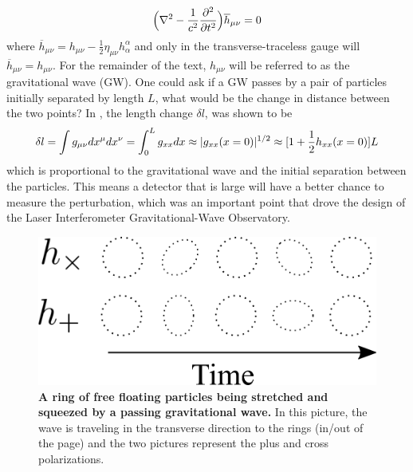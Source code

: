 	\begin{equation} \label{wave}
	\Big(\nabla^2 - \frac{1}{c^2} \pdv[2]{t} \Big) \overline{h}_{\mu \nu}  = 0
	\end{equation}
	where $\overline{h}_{\mu \nu} = h_{\mu \nu} - \frac{1}{2} \eta_{\mu \nu} h^\alpha_\alpha$ and only in the transverse-traceless gauge \cite{SchutzGR} will $\overline{h}_{\mu \nu} = h_{\mu \nu}$.  For the remainder of the text, $h_{\mu \nu}$ will be referred to as the gravitational wave (GW).  One could ask if a GW passes by a pair of particles initially separated by length $L$, what would be the change in distance between the two points? In \cite{SchutzGR}, the length change $\delta l$, was shown to be
	\begin{equation}\label{propdist}
	\delta l
	= \int{g_{\mu \nu} dx^{\mu} dx^{\nu}} \\
	= \int_{0}^{L}{g_{xx} {d}x}\\
	\approx |g_{xx}(x=0)|^{1/2}\\
	\approx [ 1 + \frac{1}{2} h_{xx}(x=0)] L
	\end{equation} 
	which is proportional to the gravitational wave and the initial separation between the particles. This means a detector that is large will have a better chance to measure the perturbation, which was an important point that drove the design of the Laser Interferometer Gravitational-Wave Observatory.
	\begin{figure}[ht]
		\centering
		\includegraphics[width=.4 \textwidth]{../Figures/GW_Particles.png}
		\caption[A ring of free floating particles being stretched and squeezed by a passing gravitational wave.]  
		{\textbf{A ring of free floating particles being stretched and squeezed by a passing gravitational wave.} 
		In this picture, the wave is traveling in the transverse direction to the rings (in/out of the page) and the two pictures represent the plus and cross polarizations.
		}
		\label{fig:gwparticles}
	\end{figure}

	\newpage

